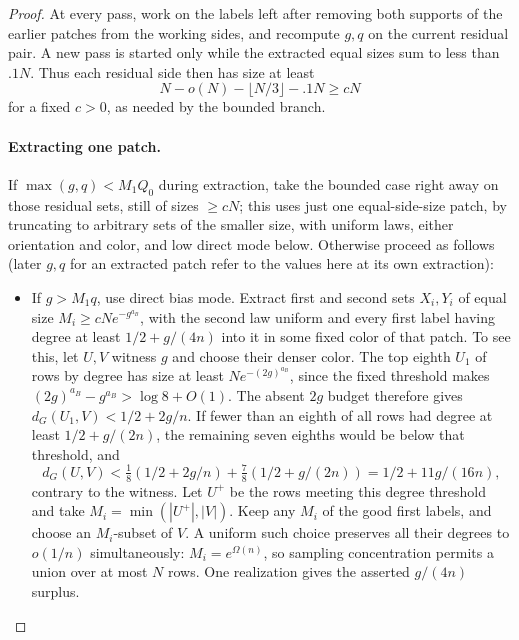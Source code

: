 \begin{proof}\leavevmode\par
At every pass, work on the labels left after removing both supports of the
earlier patches from the working sides, and recompute \(g,q\) on the current
residual pair. A new pass is
started only while the extracted equal sizes sum to less than \(.1N\).
Thus each residual side then has size at least
\[
N-o(N)-\lfloor N/3\rfloor-.1N\ge cN
\]
for a fixed \(c>0\), as needed by the bounded branch.

\paragraph{Extracting one patch.}
If \(\max(g,q)<M_1 Q_0\) during extraction, take the bounded case right away on those residual sets, still of sizes \(\ge cN\); this uses just one equal-side-size patch, by truncating to arbitrary sets of the smaller size, with uniform laws, either orientation and color, and low direct mode below. Otherwise proceed as follows (later \(g,q\) for an extracted patch refer to the values here at its own extraction):
\begin{itemize}
\item If \(g>M_1 q\), use direct bias mode. Extract first and second sets \(X_i,Y_i\) of equal size \(M_i\ge c N e^{-g^{a_B}}\), with the second law uniform and every first label having degree at least \(1/2+g/(4n)\) into it in some fixed color of that patch. To see this, let \(U,V\) witness \(g\) and choose their denser color. The top eighth \(U_1\) of rows by degree has size at least \(Ne^{-(2g)^{a_B}}\), since the fixed threshold makes \((2g)^{a_B}-g^{a_B}>\log8+O(1)\). The absent \(2g\) budget therefore gives \(d_G(U_1,V)<1/2+2g/n\). If fewer than an eighth of all rows had degree at least \(1/2+g/(2n)\), the remaining seven eighths would be below that threshold, and
\[
 d_G(U,V)<\tfrac18(1/2+2g/n)+\tfrac78(1/2+g/(2n))
             =1/2+11g/(16n),
\]
contrary to the witness. Let \(U^+\) be the rows meeting this degree threshold and take \(M_i=\min(|U^+|,|V|)\). Keep any \(M_i\) of the good first labels, and choose an \(M_i\)-subset of \(V\). A uniform such choice preserves all their degrees to \(o(1/n)\) simultaneously: \(M_i=e^{\Omega(n)}\), so sampling concentration permits a union over at most \(N\) rows. One realization gives the asserted \(g/(4n)\) surplus.

\end{itemize}
\end{proof}
